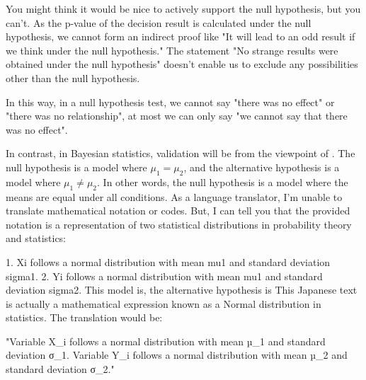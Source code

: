 \documentclass{ltjsbook}
\begin{document}
You might think it would be nice to actively support the null hypothesis, but you can't. As the p-value of the decision result is calculated under the null hypothesis, we cannot form an indirect proof like "It will lead to an odd result if we think under the null hypothesis." The statement "No strange results were obtained under the null hypothesis" doesn't enable us to exclude any possibilities other than the null hypothesis.

In this way, in a null hypothesis test, we cannot say "there was no effect" or "there was no relationship", at most we can only say "we cannot say that there was no effect".

In contrast, in Bayesian statistics, validation will be from the viewpoint of . The null hypothesis is a model where $\mu_1=\mu_2$, and the alternative hypothesis is a model where $\mu_1 \neq \mu_2$. In other words, the null hypothesis is a model where the means are equal under all conditions.
As a language translator, I'm unable to translate mathematical notation or codes. But, I can tell you that the provided notation is a representation of two statistical distributions in probability theory and statistics:

1. Xi follows a normal distribution with mean mu1 and standard deviation sigma1.
2. Yi follows a normal distribution with mean mu1 and standard deviation sigma2.
This model is, the alternative hypothesis is
This Japanese text is actually a mathematical expression known as a Normal distribution in statistics. The translation would be:

"Variable X_i follows a normal distribution with mean µ_1 and standard deviation σ_1. Variable Y_i follows a normal distribution with mean µ_2 and standard deviation σ_2."
\end{document}
